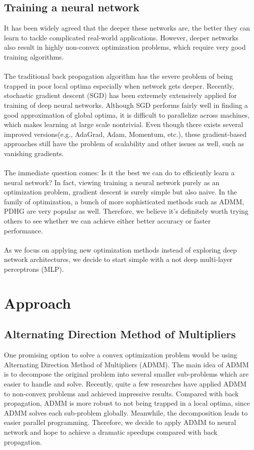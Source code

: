 \documentclass[11pt]{report}
\begin{document}
\subsection*{Training a neural network}
It has been widely agreed that the deeper these networks are, the better they can learn to tackle complicated real-world applications. However, deeper networks also result in highly non-convex optimization problems, which require very good training algorithms. \\
\\
The traditional back propagation algorithm has the severe problem of being trapped in poor local optima especially when network gets deeper. Recently, stochastic gradient descent (SGD) has been extremely extensively applied for training of deep neural networks. Although SGD performs fairly well in finding a good approximation of global optima, it is difficult to parallelize across machines, which makes learning at large scale nontrivial.  Even though there exists several improved versions(e.g., AdaGrad, Adam, Momentum, etc.), these gradient-based approaches still have the problem of scalability and other issues as well, such as vanishing gradients.\\
\\
The immediate question comes: Is it the best we can do to efficiently learn a neural network?  In fact, viewing training a neural network purely as an optimization problem, gradient descent is surely simple but also naive.  In the family of optimization, a bunch of more sophisticated methods such as ADMM, PDHG are very popular as well. Therefore, we believe it's definitely worth trying others to see whether we can achieve either better accuracy or faster performance.
\\\\
As we focus on applying new optimization methods instead of exploring deep network architectures, we decide to start simple with a not deep multi-layer perceptrons (MLP).

\section*{Approach}
\subsection*{Alternating Direction Method of Multipliers}
One promising option to solve a convex optimization problem  would be using Alternating Direction Method of Multipliers (ADMM). The main idea of ADMM is to decompose the original problem into several smaller sub-problems which are easier to handle and solve. Recently, quite a few researches have applied ADMM to non-convex problems and achieved impressive results. Compared with back propagation, ADMM is more robust to not being trapped in a local optima, since ADMM solves each sub-problem globally. Meanwhile, the decomposition leads to easier parallel programming. Therefore, we decide to apply ADMM to neural network and hope to achieve a dramatic speedups compared with back propagation.
\end{document}
